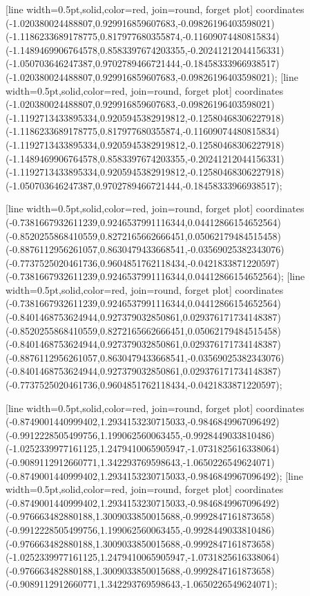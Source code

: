 [line width=0.5pt,solid,color=red, join=round, forget plot] coordinates {(-1.020380024488807,0.929916859607683,-0.09826196403598021) (-1.1186233689178775,0.817977680355874,-0.11609074480815834) (-1.1489469906764578,0.8583397674203355,-0.20241212044156331) (-1.050703646247387,0.9702789466721444,-0.18458333966938517) (-1.020380024488807,0.929916859607683,-0.09826196403598021)};
[line width=0.5pt,solid,color=red, join=round, forget plot] coordinates {(-1.020380024488807,0.929916859607683,-0.09826196403598021) (-1.1192713433895334,0.9205945382919812,-0.12580468306227918) (-1.1186233689178775,0.817977680355874,-0.11609074480815834) (-1.1192713433895334,0.9205945382919812,-0.12580468306227918) (-1.1489469906764578,0.8583397674203355,-0.20241212044156331) (-1.1192713433895334,0.9205945382919812,-0.12580468306227918) (-1.050703646247387,0.9702789466721444,-0.18458333966938517)};

[line width=0.5pt,solid,color=red, join=round, forget plot] coordinates {(-0.7381667932611239,0.9246537991116344,0.04412866154652564) (-0.8520255868410559,0.8272165662666451,0.05062179484515458) (-0.8876112956261057,0.8630479433668541,-0.03569025382343076) (-0.7737525020461736,0.9604851762118434,-0.0421833871220597) (-0.7381667932611239,0.9246537991116344,0.04412866154652564)};
[line width=0.5pt,solid,color=red, join=round, forget plot] coordinates {(-0.7381667932611239,0.9246537991116344,0.04412866154652564) (-0.8401468753624944,0.927379032850861,0.029376171734148387) (-0.8520255868410559,0.8272165662666451,0.05062179484515458) (-0.8401468753624944,0.927379032850861,0.029376171734148387) (-0.8876112956261057,0.8630479433668541,-0.03569025382343076) (-0.8401468753624944,0.927379032850861,0.029376171734148387) (-0.7737525020461736,0.9604851762118434,-0.0421833871220597)};

[line width=0.5pt,solid,color=red, join=round, forget plot] coordinates {(-0.8749001440999402,1.2934153230715033,-0.9846849967096492) (-0.9912228505499756,1.199062560063455,-0.9928449033810486) (-1.0252339977161125,1.2479410065905947,-1.0731825616338064) (-0.9089112912660771,1.342293769598643,-1.0650226549624071) (-0.8749001440999402,1.2934153230715033,-0.9846849967096492)};
[line width=0.5pt,solid,color=red, join=round, forget plot] coordinates {(-0.8749001440999402,1.2934153230715033,-0.9846849967096492) (-0.976663482880188,1.3009033850015688,-0.9992847161873658) (-0.9912228505499756,1.199062560063455,-0.9928449033810486) (-0.976663482880188,1.3009033850015688,-0.9992847161873658) (-1.0252339977161125,1.2479410065905947,-1.0731825616338064) (-0.976663482880188,1.3009033850015688,-0.9992847161873658) (-0.9089112912660771,1.342293769598643,-1.0650226549624071)};

